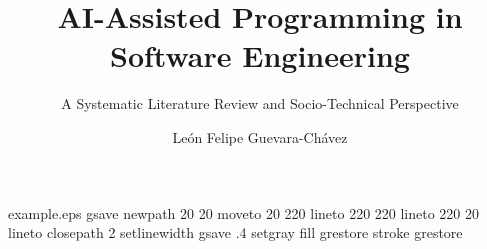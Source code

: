 %
%
%
%
%
\begin{filecontents*}{example.eps}
gsave
newpath
  20 20 moveto
  20 220 lineto
  220 220 lineto
  220 20 lineto
closepath
2 setlinewidth
gsave
  .4 setgray fill
grestore
stroke
grestore
\end{filecontents*}
%
\RequirePackage{fix-cm}
%
\documentclass[smallextended]{svjour3}       %
%
\smartqed  %
%
\usepackage{graphicx}
%
%
%
%
%


\title{AI-Assisted Programming in Software Engineering}
\subtitle{A Systematic Literature Review and Socio-Technical Perspective}


\author{León Felipe Guevara-Chávez}



